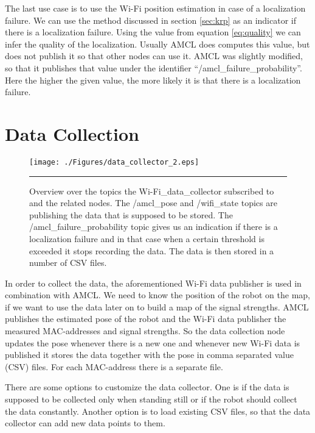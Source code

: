 The last use case is to use the Wi-Fi position estimation in case of a localization failure. We can use the method discussed in section \ref{sec:krp} as an indicator if there is a localization failure. Using the value from equation \ref{eq:quality} we can infer the quality of the localization. Usually AMCL does computes this value, but does not publish it so that other nodes can use it. AMCL was slightly modified, so that it publishes that value under the identifier ``/amcl\_failure\_probability''. Here the higher the given value, the more likely it is that there is a localization failure.

\section{Data Collection}\label{sec:data_coll}
\begin{figure}[htbp]
	\centering
		\texttt{[image: ./Figures/data\_collector\_2.eps]}
		\rule{35em}{0.5pt}
	\caption[Diagram of wifi\_data\_collector]{Overview over the topics the Wi-Fi\_data\_collector subscribed to and the related nodes. The /amcl\_pose and /wifi\_state topics are publishing the data that is supposed to be stored. The /amcl\_failure\_probability topic gives us an indication if there is a localization failure and in that case when a certain threshold is exceeded it stops recording the data. The data is then stored in a number of CSV files.}
	\label{fig:data_collector}
\end{figure}
In order to collect the data, the aforementioned Wi-Fi data publisher is used in combination with AMCL. We need to know the position of the robot on the map, if we want to use the data later on to build a map of the signal strengths. AMCL publishes the estimated pose of the robot and the Wi-Fi data publisher the measured \Gls{MAC-address}es and signal strengths. So the data collection node updates the pose whenever there is a new one and whenever new Wi-Fi data is published it stores the data together with the pose in comma separated value (CSV) files. For each \Gls{MAC-address} there is a separate file. 

There are some options to customize the data collector. One is if the data is supposed to be collected only when standing still or if the robot should collect the data constantly. Another option is to load existing CSV files, so that the data collector can add new data points to them. 

